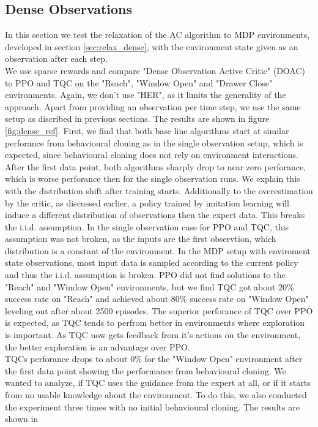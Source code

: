 \subsection{Dense Observations}
\label{sec:DO_exp}
In this section we test the relaxation of the AC algorithm to MDP environments, developed in section \ref{sec:relax_dense}, with the environment state given as an observation after each step. \\
We use sparse rewards 
and compare "Dense Observation Active Critic" (DOAC) to PPO and TQC on the "Reach", "Window Open" and "Drawer Close" environments. Again, we don't use "HER", as it limits the generality of 
the approach. Apart from 
providing an observation per time step,
we use the same setup as discribed in previous sections. The results are shown in figure \ref{fig:dense_ref}. First, we find that both base line algorithms 
start at similar perforance from behavioural cloning as in the single observation setup, which is expected, since behavioural cloning does not rely on 
environment interactions. After the first data point, both algorithms sharply drop to near zero perforance, which is worse perforance then for the single 
observation runs. We explain this with the distribution shift after training starts. Additionally to the overestimation by the critic, as discussed earlier, a policy trained by imitation learning 
will induce a different distribution of observations then the expert data. This breaks the i.i.d. assumption. In the single observation case for PPO and TQC, this assumption was not broken, 
as the inputs are the first observtion, which distribution is a constant of the environment. In the MDP setup with enviroment state observations, most input data is 
sampled according to the current policy and thus the i.i.d. assumption is broken. PPO did not find solutions to the "Reach" and "Window Open" environments, 
but we find TQC got about $20 \%$ success rate on "Reach" and achieved about $80 \%$ success rate on "Window Open" leveling out after about 2500 episodes. 
The superior perforance of TQC over PPO is expected, as TQC tends to perfrom better in environments where exploration is important. As TQC now gets 
feedback from it's actions on the environment, the better exploration is an advantage over PPO.\\ 
TQCs perforance drops to about $0 \%$ for the "Window Open" 
environment after the first data point showing the performance from behavioural cloning. We wanted to analyze, if TQC uses the guidance from the expert at all, or if it starts from 
no usable knowledge about the environment. To do this, we also conducted the experiment three times with no initial behavioural cloning. The results are shown in 
